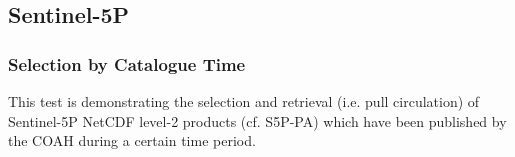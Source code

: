 \documentclass[dec_sum_main.tex]{subfiles}
\begin{document}
\subsection{Sentinel-5P}


\subsubsection{Selection by Catalogue Time}
This test is demonstrating the selection and retrieval (i.e. pull circulation) of Sentinel-5P NetCDF level-2 products (cf. S5P-PA) which have been published by the COAH during a certain time period. \newline

 \newline
\end{document}
